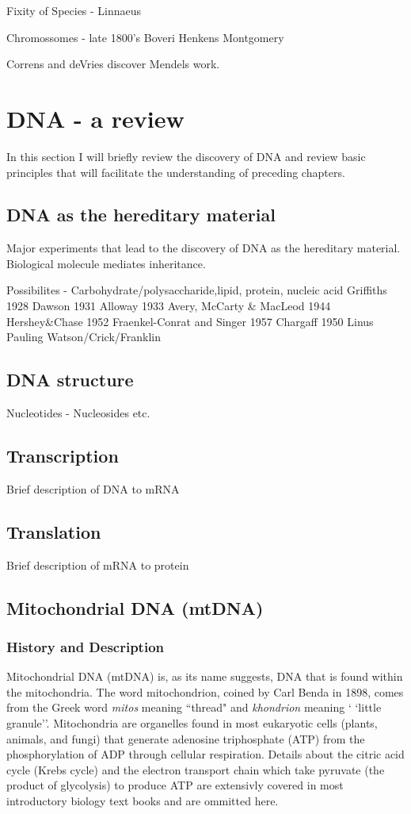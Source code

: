 \documentclass{report}\usepackage[]{graphicx}\usepackage[]{color}
\begin{document}
 Fixity of Species - Linnaeus 
 
 Chromossomes - late 1800's 
 Boveri
 Henkens
 Montgomery
 
 Correns and deVries discover Mendels work. 

\chapter{DNA - a review}
In this section I will briefly review the discovery of DNA and review basic principles that will facilitate the 
understanding of preceding chapters. 

\section{DNA as the hereditary material}
Major experiments that lead to the discovery of DNA as the hereditary material. 
Biological molecule mediates inheritance. 

Possibilites - Carbohydrate/polysaccharide,lipid, protein, nucleic acid
Griffiths 1928
Dawson 1931
Alloway 1933
Avery, McCarty \& MacLeod 1944
Hershey\&Chase 1952
Fraenkel-Conrat and Singer 1957
Chargaff 1950
Linus Pauling
Watson/Crick/Franklin
\section{DNA structure}
Nucleotides - Nucleosides etc. 
\section{Transcription}
Brief description of DNA to mRNA
\section{Translation}
Brief description of mRNA to protein

\section{Mitochondrial DNA (mtDNA)}
\subsection*{History and Description}
Mitochondrial DNA (mtDNA) is, as its name suggests, DNA that is found within the mitochondria.
The word mitochondrion, coined by Carl Benda in 1898,  comes from the Greek word \textit{mitos} 
meaning ``thread" and \textit{khondrion} meaning ` `little granule''. Mitochondria are organelles 
found in most eukaryotic cells (plants, animals, and 
fungi) that generate adenosine triphosphate (ATP) from the phosphorylation of ADP through
cellular respiration. Details about the citric acid cycle (Krebs cycle) and the electron transport 
chain which take pyruvate (the product of glycolysis) to produce ATP are extensivly covered in most 
introductory biology text books and are ommitted here. 
\end{document}

